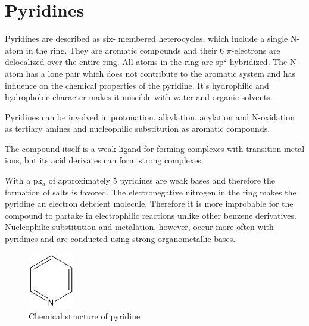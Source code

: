 \chapter{Pyridines}
Pyridines are described as six- membered heterocycles, which include a single N-atom in the ring. They are aromatic compounds and their  6 $\pi$-electrons are delocalized over the entire ring. All atoms in the ring are sp$^2$ hybridized. The N-atom has a lone pair which does not contribute to the aromatic system and has influence on the chemical properties of the pyridine.
It's hydrophilic and hydrophobic character makes it miscible with water and organic solvents. \cite{joule}

Pyridines can be involved in  protonation, alkylation, acylation and N-oxidation as  tertiary amines and nucleophilic substitution as aromatic compounds.

The compound itself is a weak ligand for forming complexes with transition metal ions, but its acid derivates can form strong complexes.

With a pk$_a$ of approximately 5 pyridines are weak bases and therefore the formation of salts is favored.
The electronegative nitrogen in the ring makes the pyridine an electron deficient molecule. Therefore it is more improbable for the compound to partake in electrophilic reactions unlike other benzene derivatives. Nucleophilic substitution and metalation, however, occur more often with pyridines and are conducted using strong organometallic bases. \cite{joule1}

\begin{figure}[htpb!]
\centering
\includegraphics{figures/pyridine.jpg}
\caption{Chemical structure of pyridine}
\label{fig:py}
\end{figure}

